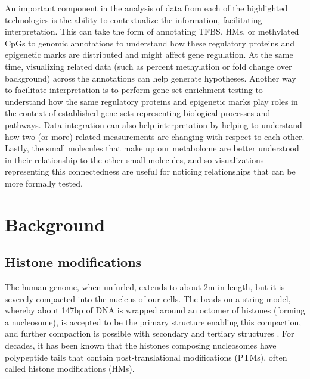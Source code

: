 An important component in the analysis of data from each of the highlighted technologies is the ability to contextualize the information, facilitating interpretation. This can take the form of annotating TFBS, HMs, or methylated CpGs to genomic annotations to understand how these regulatory proteins and epigenetic marks are distributed and might affect gene regulation. At the same time, visualizing related data (such as percent methylation or fold change over background) across the annotations can help generate hypotheses. Another way to facilitate interpretation is to perform gene set enrichment testing to understand how the same regulatory proteins and epigenetic marks play roles in the context of established gene sets representing biological processes and pathways. Data integration can also help interpretation by helping to understand how two (or more) related measurements are changing with respect to each other. Lastly, the small molecules that make up our metabolome are better understood in their relationship to the other small molecules, and so visualizations representing this connectedness are useful for noticing relationships that can be more formally tested.

\section{Background}

\subsection{Histone modifications}

The human genome, when unfurled, extends to about 2m in length, but it is severely compacted into the nucleus of our cells. The beads-on-a-string model, whereby about 147bp of DNA is wrapped around an octomer of histones (forming a nucleosome), is accepted to be the primary structure enabling this compaction, and further compaction is possible with secondary and tertiary structures \cite{Luger:2012gc}. For decades, it has been known that the histones composing nucleosomes have polypeptide tails that contain post-translational modifications (PTMs), often called histone modifications (HMs).

